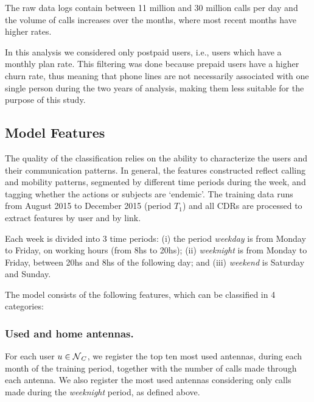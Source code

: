 The raw data logs contain between 11 million and 30 million calls per day and the volume of calls increases over the months, where most recent months have higher rates.

In this analysis we considered only postpaid users, i.e., users which have a monthly  plan rate. This filtering was done because prepaid users have a higher churn rate, thus meaning that phone lines are not necessarily associated with one single person during the two years of analysis, making them less suitable for the purpose of this study.




\subsection{Model Features}

The quality of the classification relies on the ability to characterize the users and their communication patterns. %
In general, the features constructed reflect calling and mobility patterns,
segmented by different time periods during the week, and tagging whether the actions or subjects are `endemic'. 
The training data runs from August 2015 to December 2015 (period $T_1$) and all CDRs are processed to extract features by user and by link. 

Each week is divided into 3 time periods: (i) the period \textit{weekday} is from Monday to Friday, on working hours (from 8hs to 20hs); (ii) \textit{weeknight} is from Monday to Friday, between 20hs and 8hs of the following day;
and (iii) \textit{weekend} is Saturday and Sunday.

The model consists of the following features, which can be classified in 4 categories:


\subsubsection{Used and home antennas.}\label{homeantenna}

For each user $u \in \operatorname{\mathcal{N}}_C$, we register the top ten most used antennas, during each month of the training period,
together with the number of calls made through each antenna. 
%
%
We also register the most used antennas considering only calls made during the \textit{weeknight} period, as defined above. %

